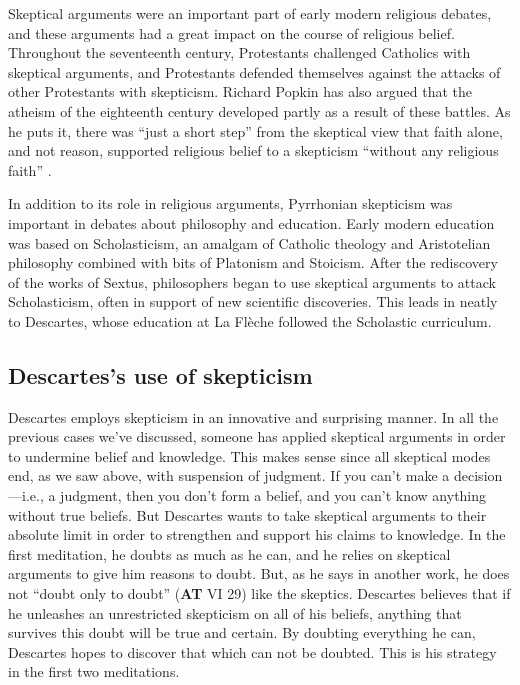 Skeptical arguments were an important part of early modern religious debates, and these arguments had a great impact on the course of religious belief. Throughout the seventeenth century, Protestants challenged Catholics with skeptical arguments, and Protestants defended themselves against the attacks of other Protestants with skepticism. Richard Popkin has also argued that the atheism of the eighteenth century developed partly as a result of these battles. As he puts it, there was ``just a short step'' from the skeptical view that faith alone, and not reason, supported religious belief to a skepticism ``without any religious faith'' \parencite[19]{popkin1993}.

In addition to its role in religious arguments, Pyrrhonian skepticism was important in debates about philosophy and education. Early modern education was based on Scholasticism, an amalgam of Catholic theology and Aristotelian philosophy combined with bits of Platonism and Stoicism. After the rediscovery of the works of Sextus, philosophers began to use skeptical arguments to attack Scholasticism, often in support of new scientific discoveries. This leads in neatly to Descartes, whose education at La Flèche followed the Scholastic curriculum.

\subsection*{Descartes's use of skepticism}

Descartes employs skepticism in an innovative and surprising manner. In all the previous cases we've discussed, someone has applied skeptical arguments in order to undermine belief and knowledge. This makes sense since all skeptical modes end, as we saw above, with suspension of judgment. If you can't make a decision---i.e., a judgment, then you don't form a belief, and you can't know anything without true beliefs. But Descartes wants to take skeptical arguments to their absolute limit in order to strengthen and support his claims to knowledge. In the first meditation, he doubts as much as he can, and he relies on skeptical arguments to give him reasons to doubt. But, as he says in another work, he does not ``doubt only to doubt'' (\textbf{AT} VI 29) like the skeptics. Descartes believes that if he unleashes an unrestricted skepticism on all of his beliefs, anything that survives this doubt will be true and certain. By doubting everything he can, Descartes hopes to discover that which can not be doubted. This is his strategy in the first two meditations.

